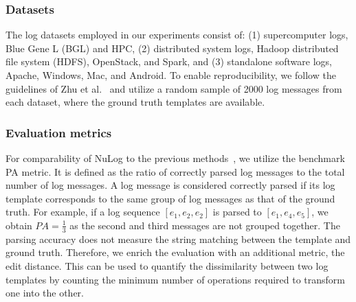 
\subsubsection{Datasets}\label{Datasets}
The log datasets employed in our experiments consist of: (1) supercomputer logs, Blue Gene L (BGL) and HPC, (2) distributed system logs, Hadoop distributed file system (HDFS), OpenStack, and Spark, and (3) standalone software logs, Apache, Windows, Mac, and Android. To enable reproducibility, we follow the guidelines of Zhu et al.~\cite{zhu2019tools} and utilize a random sample of 2000 log messages from each dataset, where the ground truth templates are available. 

\subsubsection{Evaluation metrics}
For comparability of NuLog to the previous methods~\cite{zhu2019tools}, we utilize the benchmark PA metric. It is defined as the ratio of correctly parsed log messages to the total number of log messages. A log message is considered correctly parsed if its log template corresponds to the same group of log messages as that of the ground truth. For example, if a log sequence $[e_1, e_2, e_2]$ is parsed to $[e_1, e_4, e_5]$, we obtain $PA=\frac{1}{3}$ as the second and third messages are not grouped together. The parsing accuracy does not measure the string matching between the template and ground truth. Therefore, we enrich the evaluation with an additional metric, the edit distance. This can be used to quantify the dissimilarity between two log templates by counting the minimum number of operations required to transform one into the other.




